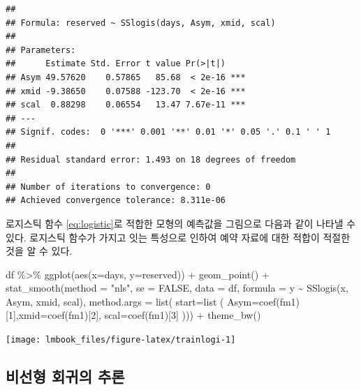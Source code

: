 \documentclass[
  10pt,
]{book}
\newenvironment{Shaded}{\begin{snugshade}}{\end{snugshade}}
\newcommand{\AttributeTok}[1]{\textcolor[rgb]{0.77,0.63,0.00}{#1}}
\newcommand{\ConstantTok}[1]{\textcolor[rgb]{0.00,0.00,0.00}{#1}}
\newcommand{\DecValTok}[1]{\textcolor[rgb]{0.00,0.00,0.81}{#1}}
\newcommand{\FunctionTok}[1]{\textcolor[rgb]{0.00,0.00,0.00}{#1}}
\newcommand{\NormalTok}[1]{#1}
\newcommand{\SpecialCharTok}[1]{\textcolor[rgb]{0.00,0.00,0.00}{#1}}
\newcommand{\StringTok}[1]{\textcolor[rgb]{0.31,0.60,0.02}{#1}}
\theoremstyle{definition}
\theoremstyle{definition}
\theoremstyle{definition}
\theoremstyle{definition}
\theoremstyle{remark}
\begin{document}
\begin{verbatim}
## 
## Formula: reserved ~ SSlogis(days, Asym, xmid, scal)
## 
## Parameters:
##      Estimate Std. Error t value Pr(>|t|)    
## Asym 49.57620    0.57865   85.68  < 2e-16 ***
## xmid -9.38650    0.07588 -123.70  < 2e-16 ***
## scal  0.88298    0.06554   13.47 7.67e-11 ***
## ---
## Signif. codes:  0 '***' 0.001 '**' 0.01 '*' 0.05 '.' 0.1 ' ' 1
## 
## Residual standard error: 1.493 on 18 degrees of freedom
## 
## Number of iterations to convergence: 0 
## Achieved convergence tolerance: 8.311e-06
\end{verbatim}

로지스틱 함수 \eqref{eq:logistic}로 적합한 모형의 예측값을 그림으로 다음과 같이 나타낼 수 있다. 로지스틱 함수가 가지고 잇는 특성으로 인하여 예약 자료에 대한 적합이 적절한 것을 알 수 있다.

\begin{Shaded}
\begin{Highlighting}[]
\NormalTok{df }\SpecialCharTok{\%\textgreater{}\%} \FunctionTok{ggplot}\NormalTok{(}\FunctionTok{aes}\NormalTok{(}\AttributeTok{x=}\NormalTok{days, }\AttributeTok{y=}\NormalTok{reserved)) }\SpecialCharTok{+} 
  \FunctionTok{geom\_point}\NormalTok{() }\SpecialCharTok{+} 
  \FunctionTok{stat\_smooth}\NormalTok{(}\AttributeTok{method =} \StringTok{"nls"}\NormalTok{, }\AttributeTok{se =} \ConstantTok{FALSE}\NormalTok{, }\AttributeTok{data =}\NormalTok{ df,}
              \AttributeTok{formula =}\NormalTok{ y }\SpecialCharTok{\textasciitilde{}} \FunctionTok{SSlogis}\NormalTok{(x, Asym, xmid, scal),}
              \AttributeTok{method.args  =} \FunctionTok{list}\NormalTok{( }\AttributeTok{start=}\FunctionTok{list}\NormalTok{ ( }\AttributeTok{Asym=}\FunctionTok{coef}\NormalTok{(fm1)[}\DecValTok{1}\NormalTok{],}\AttributeTok{xmid=}\FunctionTok{coef}\NormalTok{(fm1)[}\DecValTok{2}\NormalTok{], }\AttributeTok{scal=}\FunctionTok{coef}\NormalTok{(fm1)[}\DecValTok{3}\NormalTok{] ))) }\SpecialCharTok{+}
  \FunctionTok{theme\_bw}\NormalTok{()}
\end{Highlighting}
\end{Shaded}

\begin{center}\texttt{[image: lmbook\_files/figure-latex/trainlogi-1]} \end{center}

\hypertarget{uxbe44uxc120uxd615-uxd68cuxadc0uxc758-uxcd94uxb860}{%
\subsection{비선형 회귀의 추론}\label{uxbe44uxc120uxd615-uxd68cuxadc0uxc758-uxcd94uxb860}}
\end{document}
